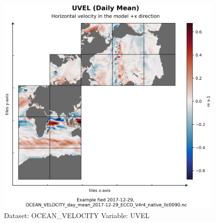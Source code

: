 \begin{longtable}{|p{}|p{}|p{}|p{}|}
\end{longtable}

\begin{figure}[H]
\centering
\includegraphics[width=\textwidth]{../images/plots/native_plots/Ocean_Velocity/UVEL.png}
\caption{Dataset: OCEAN\_VELOCITY Variable: UVEL}
\label{tab:table-OCEAN_VELOCITY_UVEL-Plot}
\end{figure}
\pagebreak
